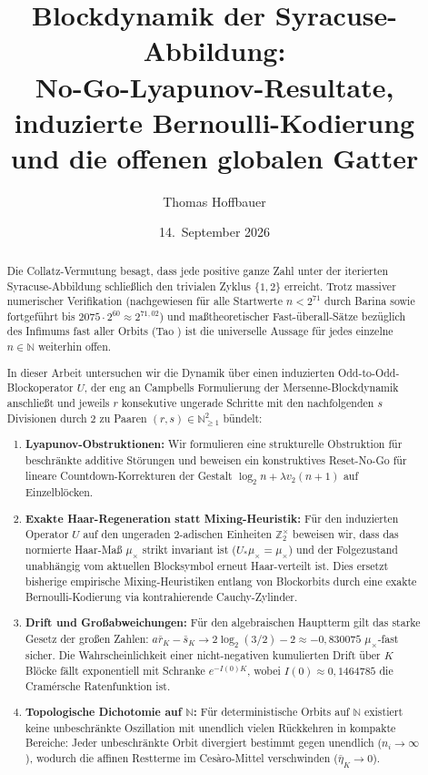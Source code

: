 \documentclass[11pt,reqno]{amsart}
\title{\textbf{\texorpdfstring{
Blockdynamik der Syracuse-Abbildung:\\
No-Go-Lyapunov-Resultate, induzierte Bernoulli-Kodierung\\
und die offenen globalen Gatter
}{
Blockdynamik der Syracuse-Abbildung:
No-Go-Lyapunov-Resultate, induzierte Bernoulli-Kodierung
und die offenen globalen Gatter
}}}
\author{Thomas Hoffbauer}
\date{14.~September 2026}
\theoremstyle{definition}
\theoremstyle{remark}
\numberwithin{equation}{section}
\begin{document}
\maketitle

\begin{abstract}
Die Collatz-Vermutung besagt, dass jede positive ganze Zahl unter der iterierten Syracuse-Abbildung schlie\ss{}lich den trivialen Zyklus $\{1, 2\}$ erreicht. Trotz massiver numerischer Verifikation (nachgewiesen f\"ur alle Startwerte $n < 2^{71}$ durch Barina \cite{Barina2025} sowie fortgef\"uhrt bis $2075 \cdot 2^{60} \approx 2^{71{,}02}$) und ma\ss{}theoretischer Fast-\"uberall-S\"atze bez\"uglich des Infimums fast aller Orbits (Tao \cite{Tao2019}) ist die universelle Aussage f\"ur jedes einzelne $n \in \mathbb{N}$ weiterhin offen.

In dieser Arbeit untersuchen wir die Dynamik \"uber einen induzierten Odd-to-Odd-Blockoperator $U$, der eng an Campbells Formulierung der Mersenne-Blockdynamik \cite{Campbell2025} anschlie\ss{}t und jeweils $r$ konsekutive ungerade Schritte mit den nachfolgenden $s$ Divisionen durch 2 zu Paaren $(r, s) \in \mathbb{N}_{\ge1}^2$ b\"undelt:
\begin{enumerate}
\item \textbf{Lyapunov-Obstruktionen:} Wir formulieren eine strukturelle Obstruktion f\"ur beschr\"ankte additive St\"orungen und beweisen ein konstruktives Reset-No-Go f\"ur lineare Countdown-Korrekturen der Gestalt $\log_2 n + \lambda v_2(n+1)$ auf Einzelbl\"ocken.
\item \textbf{Exakte Haar-Regeneration statt Mixing-Heuristik:} F\"ur den induzierten Operator $U$ auf den ungeraden $2$-adischen Einheiten $\mathbb{Z}_2^\times$ beweisen wir, dass das normierte Haar-Ma\ss{} $\mu_\times$ strikt invariant ist ($U_* \mu_\times = \mu_\times$) und der Folgezustand unabh\"angig vom aktuellen Blocksymbol erneut Haar-verteilt ist. Dies ersetzt bisherige empirische Mixing-Heuristiken entlang von Blockorbits durch eine exakte Bernoulli-Kodierung via kontrahierende Cauchy-Zylinder.
\item \textbf{Drift und Gro\ss{}abweichungen:} F\"ur den algebraischen Hauptterm gilt das starke Gesetz der gro\ss{}en Zahlen: $a\bar{r}_K - \bar{s}_K \to 2\log_2(3/2) - 2 \approx -0{,}830075$ $\mu_\times$-fast sicher. Die Wahrscheinlichkeit einer nicht-negativen kumulierten Drift \"uber $K$ Bl\"ocke f\"allt exponentiell mit Schranke $e^{-I(0) K}$, wobei $I(0) \approx 0{,}1464785$ die Cram\'ersche Ratenfunktion ist.
\item \textbf{Topologische Dichotomie auf $\mathbb{N}$:} F\"ur deterministische Orbits auf $\mathbb{N}$ existiert keine unbeschr\"ankte Oszillation mit unendlich vielen R\"uckkehren in kompakte Bereiche: Jeder unbeschr\"ankte Orbit divergiert bestimmt gegen unendlich ($n_i \to \infty$), wodurch die affinen Restterme im Ces\`aro-Mittel verschwinden ($\bar{\eta}_K \to 0$).

\end{enumerate}
\end{abstract}
\end{document}
